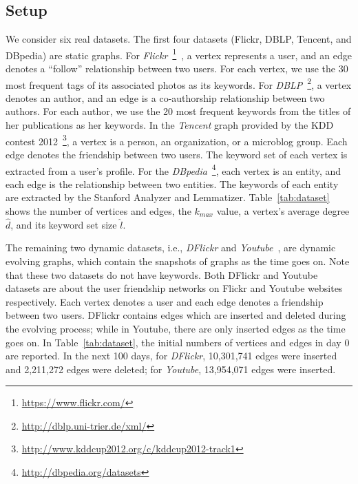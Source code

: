 \subsection{Setup}
\label{setup}

We consider six real datasets. The first four datasets (Flickr, DBLP, Tencent, and DBpedia) are static graphs.
For {\it Flickr}~\footnote{\url{https://www.flickr.com/}}~\cite{thomee2015new}, a vertex represents a user, and an edge denotes a ``follow'' relationship between two users. For each vertex, we use the 30 most frequent tags of its associated photos as its keywords.
For {\it DBLP}~\footnote{\url{http://dblp.uni-trier.de/xml/}}, a vertex denotes an author, and an edge is a co-authorship relationship between two authors.
For each author, we use the 20 most frequent keywords from the titles of her publications as her keywords.
In the {\it Tencent} graph provided by the KDD contest 2012~\footnote{\url{http://www.kddcup2012.org/c/kddcup2012-track1}}, a vertex is a person, an organization, or a microblog group. Each edge denotes the friendship between two users. The keyword set of each vertex is extracted from a user's profile. For the {\it DBpedia}~\footnote{\url{http://dbpedia.org/datasets}}, each vertex is an entity, and each edge is the relationship between two entities. The keywords of each entity are extracted by the Stanford Analyzer and Lemmatizer.
Table~\ref{tab:dataset} shows the number of vertices and edges, the $k_{max}$ value, a vertex's average degree $\widehat d$, and its keyword set size $\widehat l$.

{\color{blue}
The remaining two dynamic datasets,
i.e., {\it DFlickr} and {\it Youtube}~\cite{mislove-2009-socialnetworksthesis,mislove-2008-flickr},
are dynamic evolving graphs, which contain the snapshots of graphs as the time goes on.
Note that these two datasets do not have keywords.
Both DFlickr and Youtube datasets are about the user friendship networks on Flickr and Youtube websites respectively.
Each vertex denotes a user and each edge denotes a friendship between two users.
DFlickr contains edges which are inserted and deleted during the evolving process;
while in Youtube, there are only inserted edges as the time goes on.
In Table~\ref{tab:dataset}, the initial numbers of vertices and edges in day 0 are reported. In the next 100 days, for {\it DFlickr}, 10,301,741 edges were inserted and 2,211,272 edges were deleted; for {\it Youtube}, 13,954,071 edges were inserted.
}


